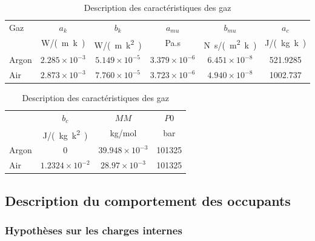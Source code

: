 \begin{table}
    \raggedright
    \begin{tabular}{l *5{c}}
        \toprule
        Gaz   & $a_{k}$              & $b_{k}$              & $a_{mu}$             & $b_{mu}$             & $a_{c}$           \\
              & \si{W/(m.k)}       & \si{W/(m.k^{2})}   & Pa.s               & \si{N.s/(m^{2}.k)} & \si{J/(kg.k)}   \\
        \midrule
        Argon & $2.285\times10^{-3}$ & $5.149\times10^{-5}$ & $3.379\times10^{-6}$ & $6.451\times10^{-8}$ & 521.9285          \\
        Air   & $2.873\times10^{-3}$ & $7.760\times10^{-5}$ & $3.723\times10^{-6}$ & $4.940\times10^{-8}$ & 1002.737          \\
        \bottomrule
    \end{tabular}
    \bigskip
    \begin{tabular}{l *3{c}}
              & $b_{c}$                & $MM$                  & $P0$       \\
              & \si{J/(kg.k^{2})}    & \si{kg/mol}         & \si{bar} \\
        \midrule
        Argon & 0                      & $39.948\times10^{-3}$ & 101325     \\
        Air   & $1.2324\times10^{-2}$  & $28.97\times10^{-3}$  & 101325     \\
        \bottomrule
    \end{tabular}
    \caption{Description des caractéristiques des gaz}
    \label{tab:compo_gaz}
\end{table}




\subsection{Description du comportement des occupants} %
\label{sub:description_du_comportement_des_occupants}

\subsubsection{Hypothèses sur les charges internes} %
\label{ssub:hypotheses_sur_les_charges_internes}

